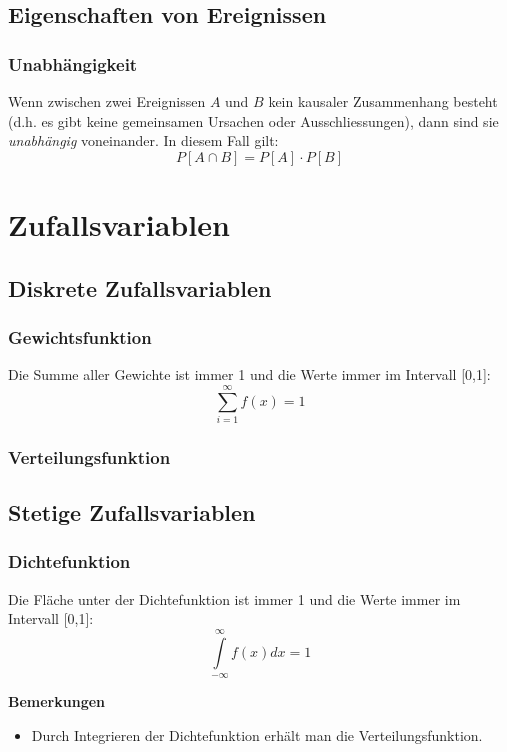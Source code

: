\documentclass[10pt,a4paper,twocolumn]{article}
\begin{document}
\subsection{Eigenschaften von Ereignissen}

\subsubsection{Unabhängigkeit}
Wenn zwischen zwei Ereignissen $A$ und $B$ kein kausaler Zusammenhang besteht (d.h. es gibt keine gemeinsamen Ursachen oder Ausschliessungen), dann sind sie \emph{unabhängig} voneinander. In diesem Fall gilt:
\[
P[A \cap B] = P[A] \cdot P[B]
\]

\section{Zufallsvariablen}

\subsection{Diskrete Zufallsvariablen}

\subsubsection{Gewichtsfunktion}
Die Summe aller Gewichte ist immer 1 und die Werte immer im Intervall [0,1]:
\[
\sum\limits_{i=1}^{\infty}f(x)=1
\]
\subsubsection{Verteilungsfunktion}

\subsection{Stetige Zufallsvariablen}

\subsubsection{Dichtefunktion}

Die Fläche unter der Dichtefunktion ist immer 1 und die Werte immer im Intervall [0,1]: 
\[
\int\limits_{-\infty}^{\infty}f(x)dx=1
\]

\textbf{Bemerkungen}
\begin{itemize}
\item Durch Integrieren der Dichtefunktion erhält man die Verteilungsfunktion.
\end{itemize}
\end{document}
